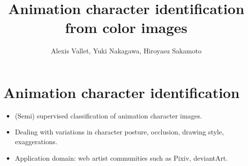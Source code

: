\documentclass{beamer}
\title{Animation character identification from color images}
\author{Alexis Vallet, Yuki Nakagawa, Hiroyasu Sakamoto}
\institute{Kyushu University, University of Technology of Belfort-Montbéliard}
\begin{document}
\frame{\titlepage}

\section{Animation character identification}

\begin{frame}
\begin{itemize}
\item (Semi) supervised classification of animation character images.
\item Dealing with variations in character posture, occlusion, drawing style, exaggerations.
\item Application domain: web artist communities such as Pixiv, deviantArt.
\end{itemize}


\end{frame}
\end{document}
